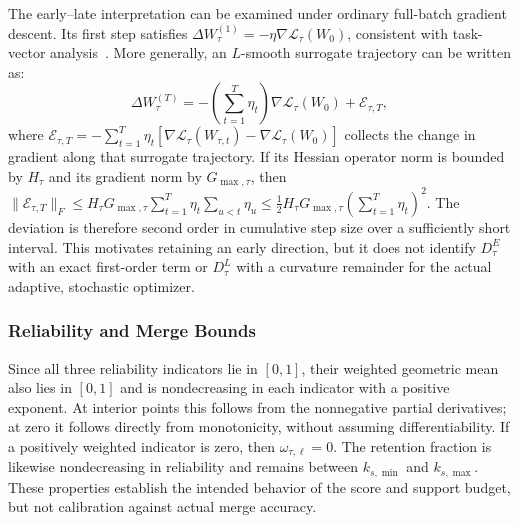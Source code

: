 \documentclass[fleqn,10pt]{wlscirep}
\begin{document}
The early--late interpretation can be examined under ordinary full-batch gradient descent. Its first step satisfies $\Delta W_{\tau}^{(1)}=-\eta\nabla\mathcal{L}_{\tau}(W_0)$, consistent with task-vector analysis~\cite{taskvectorsgradients2026}. More generally, an $L$-smooth surrogate trajectory can be written as:
\begin{equation}
\Delta W_{\tau}^{(T)}
=-\left(\sum_{t=1}^{T}\eta_t\right)
\nabla\mathcal{L}_{\tau}(W_0)+\mathcal{E}_{\tau,T},
\label{eq:task_vector_expansion}
\end{equation}
where $\mathcal{E}_{\tau,T}=-\sum_{t=1}^{T}\eta_t [\nabla\mathcal{L}_{\tau}(W_{\tau,t})- \nabla\mathcal{L}_{\tau}(W_0)]$ collects the change in gradient along that surrogate trajectory. If its Hessian operator norm is bounded by $H_{\tau}$ and its gradient norm by $G_{\max,\tau}$, then $\|\mathcal{E}_{\tau,T}\|_F\leq H_{\tau}G_{\max,\tau}\sum_{t=1}^{T}\eta_t \sum_{u<t}\eta_u\leq \tfrac12H_{\tau}G_{\max,\tau}(\sum_{t=1}^{T}\eta_t)^2$. The deviation is therefore second order in cumulative step size over a sufficiently short interval. This motivates retaining an early direction, but it does not identify $D_{\tau}^{E}$ with an exact first-order term or $D_{\tau}^{L}$ with a curvature remainder for the actual adaptive, stochastic optimizer.

\subsubsection{Reliability and Merge Bounds}
\label{subsubsec:reliability_analysis}
\label{subsubsec:merging_quality}
\label{subsubsec:merged_generalization}

Since all three reliability indicators lie in $[0,1]$, their weighted geometric mean also lies in $[0,1]$ and is nondecreasing in each indicator with a positive exponent. At interior points this follows from the nonnegative partial derivatives; at zero it follows directly from monotonicity, without assuming differentiability. If a positively weighted indicator is zero, then $\omega_{\tau,\ell}=0$. The retention fraction is likewise nondecreasing in reliability and remains between $k_{s,\min}$ and $k_{s,\max}$. These properties establish the intended behavior of the score and support budget, but not calibration against actual merge accuracy.
\end{document}
